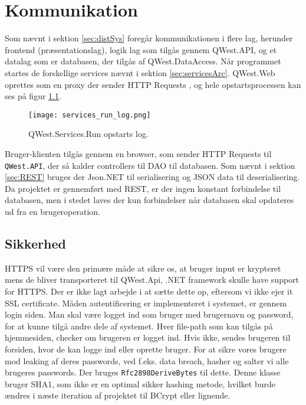 \chapter{Kommunikation}\label{ch:communication}
Som nævnt i sektion \ref{sec:distSys} foregår kommunikationen i flere lag, herunder frontend (præsentationslag), logik lag som tilgås gennem QWest.API, og et datalag som er databasen, der tilgås af QWest.DataAccess. 
Når programmet startes de forskellige services nævnt i sektion \ref{sec:servicesArc}. QWest.Web oprettes som en proxy der sender HTTP Requests \cite{DistributedSystems}, og hele opstartsprocessen kan ses på figur \ref{fig:startup_log}.

\begin{figure}
    \texttt{[image: services\_run\_log.png]}
    \caption{QWest.Services.Run opstarts log.}
    \label{fig:startup_log}
\end{figure}

Bruger-klienten tilgås gennem en browser, som sender HTTP Requests til \texttt{QWest.API}, der så kalder controllers til DAO til databasen. Som nævnt i sektion \ref{sec:REST} bruges der Json.NET til serialisering og JSON data til deserialisering. Da projektet er gennemført med REST, er der ingen konstant forbindelse til databasen, men i stedet laves der kun forbindelser når databasen skal opdateres ud fra en brugeroperation. 

\section{Sikkerhed}\label{sec:security}
HTTPS vil være den primære måde at sikre os, at bruger input er krypteret mens de bliver transporteret til QWest.Api, .NET framework skulle have support for HTTPS. \cite{DotNetFrameworkSSL} Der er ikke lagt arbejde i at sætte dette op, eftersom vi ikke ejer it SSL certificate. 
Måden autentificering er implementeret i systemet, er gennem login siden. Man skal være logget ind som bruger med brugernavn og password, for at kunne tilgå andre dele af systemet. Hver file-path som kan tilgås på hjemmesiden, checker om brugeren er logget ind. Hvis ikke, sendes brugeren til forsiden, hvor de kan logge ind eller oprette bruger.
For at sikre vores brugere mod leaking af deres passwords, ved f.eks. data breach, hasher og salter vi alle brugeres passwords. Der bruges \texttt{Rfc2898DeriveBytes} \cite{Rfc2898DeriveBytes} til dette. Denne klasse bruger SHA1, som ikke er en optimal sikker hashing metode, hvilket burde ændres i næste iteration af projektet \cite{HowsecureisSHA1} til BCrypt \cite{BCrypt} eller lignende.

